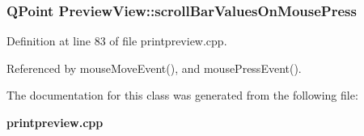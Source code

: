 \subsubsection{\setlength{\rightskip}{0pt plus 5cm}QPoint {\bf Preview\-View::scroll\-Bar\-Values\-On\-Mouse\-Press}\hspace{0.3cm}{\tt  [private]}}\label{classPreviewView_2ff680f6051ccadbf81d998c386abde2}




Definition at line 83 of file printpreview.cpp.

Referenced by mouse\-Move\-Event(), and mouse\-Press\-Event().

The documentation for this class was generated from the following file:\begin{CompactItemize}
\item 
{\bf printpreview.cpp}\end{CompactItemize}

